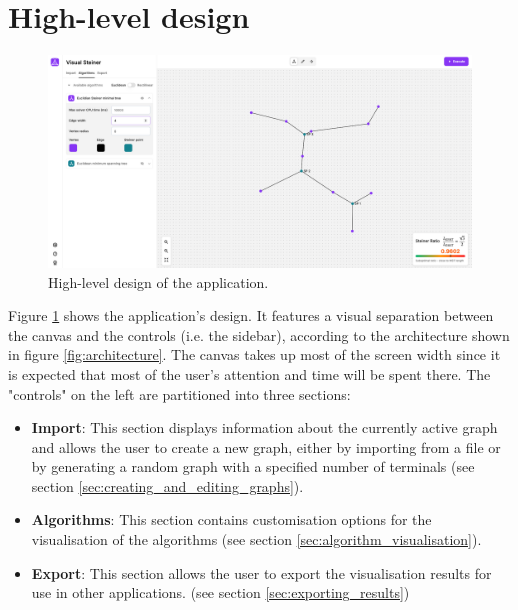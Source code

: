 \documentclass{l4proj}
\begin{document}
\section{High-level design}
\label{sec:high_level_design}
\begin{figure}[h]
    \centering
    \begin{tcolorbox}[colframe=gray!20, colback=gray!5, boxrule=1pt, arc=0mm, boxsep=0pt, left=0pt, right=0pt, top=0pt, bottom=0pt]
        \includegraphics[width=\textwidth]{images/app_overview.png}
    \end{tcolorbox}

    \caption{High-level design of the application.}
    \label{fig:high_level_design}
\end{figure}
Figure \ref{fig:high_level_design} shows the application's design. It features a visual separation between the canvas and the controls (i.e. the sidebar), according to the architecture shown in figure \ref{fig:architecture}.
The canvas takes up most of the screen width since it is expected that most of the user's attention and time will be spent there. The "controls" on the left are partitioned into three sections:
\begin{itemize}
    \item \textbf{Import}: This section displays information about the currently active graph and allows the user to create a new graph, either by importing from a file or by generating a random graph with a specified number of terminals (see section \ref{sec:creating_and_editing_graphs}).
    \item \textbf{Algorithms}: This section contains customisation options for the visualisation of the algorithms (see section \ref{sec:algorithm_visualisation}).
    \item \textbf{Export}: This section allows the user to export the visualisation results for use in other applications. (see section \ref{sec:exporting_results})
\end{itemize}
\end{document}
